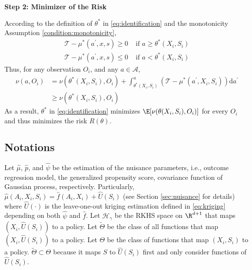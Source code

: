 \noindent \textbf{Step 2: Minimizer of the Risk}

\noindent According to the definition of $\theta^*$ in \eqref{eq:identification} and the monotonicity Assumption \ref{condition:monotonicity},
\begin{align*}
    \mathcal{T} - \mu^*(a^\prime, x, s) \geq 0 &\text{ if } a\geq \theta^*(X_i,S_i)\\
    \mathcal{T} - \mu^*(a^\prime, x, s) \leq 0 &\text{ if } a< \theta^*(X_i,S_i)
\end{align*}
Thus, for any observation $O_i$, and any $a\in \mathcal{A}$,
\begin{align*}
   \nu(a,O_i)& = \nu(\theta^*(X_i,S_i),O_i) +
   \int_{\theta^*(X_i,S_i)}^{a} \left( \mathcal{T} - \mu^*(a^\prime, X_i, S_i) \right)  \mathrm{d}a^\prime\\
   &\geq \nu(\theta^*(X_i,S_i),O_i)
\end{align*}
As a result, $\theta^*$ in \eqref{eq:identification} minimizes $\E[\nu(\theta(X_i,S_i),O_i)]$ for every $O_i$ and thus minimizes the risk $R(\theta)$.




\subsection{Notations}\label{sec:supp_notations}
Let $\widehat\mu$, $\widehat p$, and $\widehat\psi$ be the estimation of the nuisance parameters, i.e., outcome regression model, the generalized propensity score, covariance function of Gaussian process, respectively. Particularly, $\widehat\mu (A_i,X_i,S_i) = \widehat f(A_i,X_i) +\widehat U(S_i)$ (see Section \ref{sec:nuisance} for details) where $\widehat U(\cdot)$ is the leave-one-out kriging estimation defined in \eqref{eq:kriging} depending on both $\widehat\psi$ and $\widehat f$. Let $\mathcal{H}_\gamma$ be the RKHS space on $\R^{d+1}$ that maps $(X_i,\widehat U(S_i))$ to a policy. Let $\widetilde\Theta$ be the class of all functions that map $(X_i,\widehat U(S_i))$ to a policy. Let $\Theta$ be the class of functions that map $(X_i,S_i)$ to a policy. $\widetilde\Theta\subset \Theta$ because it maps $S$ to $\widehat U(S_i)$ first and only consider functions of $\widehat U(S_i)$. 


